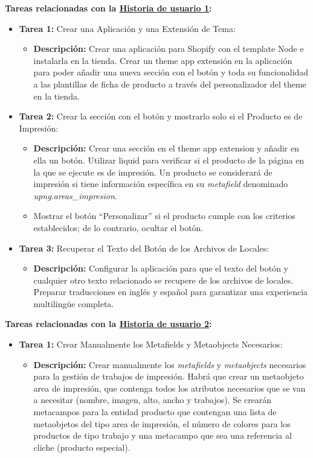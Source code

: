 \documentclass[11pt]{article}
\begin{document}
\textbf{Tareas relacionadas con la \hyperref[sec:historia1]{Historia de usuario 1}:}
\begin{itemize}
    \item \textbf{Tarea 1:} Crear una Aplicación y una Extensión de Tema:
          \begin{itemize}[label=--]
              \item \textbf{Descripción:} Crear una aplicación para Shopify con el template Node e instalarla en la tienda. Crear un theme app extensión en la aplicación para poder añadir una nueva sección con el botón y toda su funcionalidad a las plantillas de ficha de producto a través del personalizador del theme en la tienda.
          \end{itemize}
    \item \textbf{Tarea 2:} Crear la sección con el botón y mostrarlo solo si el Producto es de Impresión:
          \begin{itemize}[label=--]
              \item \textbf{Descripción:} Crear una sección en el theme app extension y añadir en ella un botón. Utilizar liquid para verificar si el producto de la página en la que se ejecute es de impresión. Un producto se considerará de impresión si tiene información específica en su \textit{metafield} denominado \textit{upng.areas\_impresion}.
              \item Mostrar el botón ``Personalizar'' si el producto cumple con los criterios establecidos; de lo contrario, ocultar el botón.
          \end{itemize}
    \item \textbf{Tarea 3:} Recuperar el Texto del Botón de los Archivos de Locales:
          \begin{itemize}[label=--]
              \item \textbf{Descripción:} Configurar la aplicación para que el texto del botón y cualquier otro texto relacionado se recupere de los archivos de locales. Preparar traducciones en inglés y español para garantizar una experiencia multilingüe completa.
          \end{itemize}
\end{itemize}

\textbf{Tareas relacionadas con la \hyperref[sec:historia2]{Historia de usuario 2}:}
\begin{itemize}
    \item \textbf{Tarea 1:} Crear Manualmente los Metafields y Metaobjects Necesarios:
          \begin{itemize}[label=--]
              \item \textbf{Descripción:} Crear manualmente los \textit{metafields} y \textit{metaobjects} necesarios para la gestión de trabajos de impresión. Habrá que crear un metaobjeto area de impresión, que contenga todos los atributos necesarios que se van a necesitar (nombre, imagen, alto, ancho y trabajos). Se crearán metacampos para la entidad producto que contengan una lista de metaobjetos del tipo area de impresión, el número de colores para los productos de tipo trabajo y una metacampo que sea una referencia al cliche (producto especial).
          \end{itemize}
\end{itemize}
\end{document}
